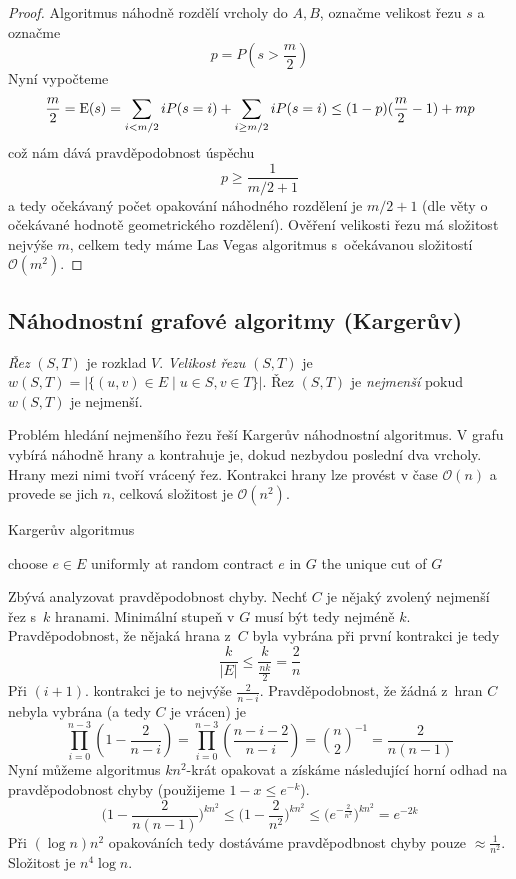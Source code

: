 \begin{proof}
    Algoritmus náhodně rozdělí vrcholy do $A, B$, označme velikost řezu
    $s$ a označme
    \[
    p = P(s > \frac{m}{2})
    \]
    Nyní vypočteme
    \[
        \frac{m}{2}
        = \operatorname{E}(s)
        = \sum_{i < m/2} i P(s = i)
        + \sum_{i \geq m/2} i P(s = i)
        \leq (1-p)(\frac{m}{2} - 1) + mp
    \]
    což nám dává pravděpodobnost úspěchu
    \[
        p \geq \frac{1}{m/2 + 1}
    \]
    a tedy očekávaný počet opakování náhodného rozdělení je $m/2 + 1$
    (dle věty o očekávané hodnotě geometrického rozdělení).
    Ověření velikosti řezu má složitost nejvýše $m$, celkem tedy máme
    Las Vegas algoritmus s~očekávanou složitostí $\mathcal{O}(m^2)$.
\end{proof}

\subsection{Náhodnostní grafové algoritmy (Kargerův)}

\begin{definition}
    {\em Řez} $(S,T)$ je rozklad $V$.
    {\em Velikost řezu} $(S,T)$ je
    $w(S,T) = \lvert \{ (u,v) \in E \mid u \in S, v \in T \} \rvert$.
    Řez $(S,T)$ je {\em nejmenší} pokud $w(S,T)$ je nejmenší.
\end{definition}

Problém hledání nejmenšího řezu řeší Kargerův náhodnostní algoritmus.
V grafu vybírá náhodně hrany a kontrahuje je, dokud nezbydou poslední
dva vrcholy. Hrany mezi nimi tvoří vrácený řez.
Kontrakci hrany lze provést v čase $\mathcal{O}(n)$ a provede se jich
$n$, celková složitost je $\mathcal{O}(n^2)$.

\begin{algorithm}
\caption{Kargerův algoritmus}
\label{alg:karger}
\begin{algorithmic}[1]
        \State choose $e \in E$ uniformly at random
        \State contract $e$ in $G$
    \EndWhile
    \State \Return the unique cut of $G$
\EndFunction
\end{algorithmic}
\end{algorithm}

Zbývá analyzovat pravděpodobnost chyby. Nechť $C$ je nějaký zvolený
nejmenší řez s~$k$ hranami. Minimální stupeň v $G$ musí být tedy nejméně
$k$. Pravděpodobnost, že nějaká hrana z~$C$ byla vybrána při první
kontrakci je tedy
\[
    \frac{k}{\lvert E \rvert} \leq \frac{k}{\frac{nk}{2}} = \frac{2}{n}
\]
Při $(i+1)$. kontrakci je to nejvýše $\frac{2}{n-i}$. Pravděpodobnost,
že žádná z~hran $C$ nebyla vybrána (a tedy $C$ je vrácen) je
\[
    \prod_{i = 0}^{n - 3} (1 - \frac{2}{n-i}) =
    \prod_{i = 0}^{n - 3} (\frac{n - i - 2}{n-i}) =
    {n \choose 2}^{-1} =
    \frac{2}{n(n-1)}
\]
Nyní můžeme algoritmus $kn^2$-krát opakovat a získáme následující
horní odhad na pravděpodobnost chyby
(použijeme $1 - x \leq e^{-k}$).
\[
    \big (1 - \frac{2}{n(n-1)} \big )^{kn^2}
    \leq \big (1 - \frac{2}{n^2} \big )^{kn^2}
    \leq \big (e^{-\frac{2}{n^2}} \big )^{kn^2}
    = e^{-2k}
\]
Při $(\log n) n^2$ opakováních tedy dostáváme pravděpodbnost chyby
pouze $\approx \frac{1}{n^2}$. Složitost je $n^4 \log n$.
